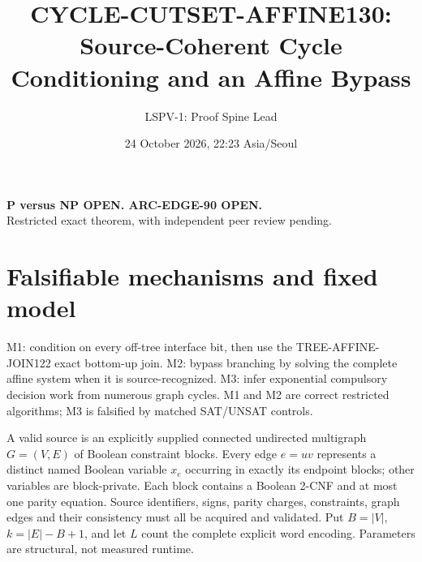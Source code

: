 \documentclass[11pt]{article}
\title{CYCLE-CUTSET-AFFINE130: Source-Coherent Cycle Conditioning and an Affine Bypass}
\author{LSPV-1: Proof Spine Lead}
\date{24 October 2026, 22:23 Asia/Seoul}
\begin{document}
\maketitle
\begin{center}\textbf{P versus NP OPEN. ARC-EDGE-90 OPEN.}\\
Restricted exact theorem, with independent peer review pending.
\end{center}
\section{Falsifiable mechanisms and fixed model}
M1: condition on every off-tree interface bit, then use the TREE-AFFINE-JOIN122 exact bottom-up join. M2: bypass branching by solving the complete affine system when it is source-recognized. M3: infer exponential compulsory decision work from numerous graph cycles. M1 and M2 are correct restricted algorithms; M3 is falsified by matched SAT/UNSAT controls.

A valid source is an explicitly supplied connected undirected multigraph $G=(V,E)$ of Boolean constraint blocks. Every edge $e=uv$ represents a distinct named Boolean variable $x_e$ occurring in exactly its endpoint blocks; other variables are block-private. Each block contains a Boolean 2-CNF and at most one parity equation. Source identifiers, signs, parity charges, constraints, graph edges and their consistency must all be acquired and validated. Put $B=|V|$, $k=|E|-B+1$, and let $L$ count the complete explicit word encoding. Parameters are structural, not measured runtime.
\end{document}
